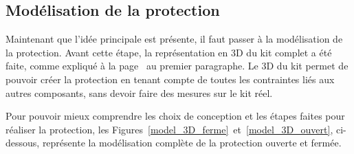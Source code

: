 \subsection{Modélisation de la protection}
Maintenant que l'idée principale est présente, il faut passer à la modélisation de la protection. Avant cette étape, la représentation en 3D du kit complet a été faite, comme expliqué à la page~\pageref{modelisation_3D} au premier paragraphe. Le 3D du kit permet de pouvoir créer la protection en tenant compte de  toutes les contraintes liés aux autres composants, sans devoir faire des mesures sur le kit réel.

Pour pouvoir mieux comprendre les choix de conception et les étapes faites pour réaliser la protection, les Figures~\ref{model_3D_ferme}~et~\ref{model_3D_ouvert}, ci-dessous, représente la modélisation complète de la protection ouverte et fermée.

